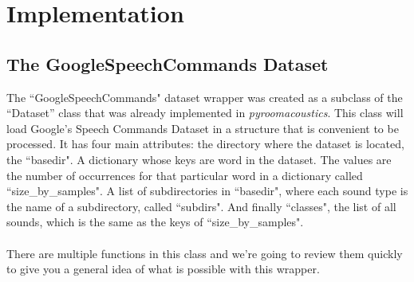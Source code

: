 \documentclass[11pt,a4paper,titlepage]{report}
\begin{document}
\chapter{Implementation}
\section{The GoogleSpeechCommands Dataset}
\hspace*{0.6cm}
The ``GoogleSpeechCommands" dataset wrapper was created as a subclass of the ``Dataset'' class that was already implemented in \textit{pyroomacoustics}. This class will load Google's Speech Commands Dataset in a structure that is convenient to be processed. It has four main attributes: the directory where the dataset is located, the ``basedir". A dictionary whose keys are word in the dataset. The values are the number of occurrences for that particular word in a dictionary called ``size\_by\_samples". A list of subdirectories in ``basedir", where each sound type is the name of a subdirectory, called ``subdirs". And finally ``classes", the list of all sounds, which is the same as the keys of ``size\_by\_samples".\\
\\
\hspace*{0.6cm}
There are multiple functions in this class and we're going to review them quickly to give you a general idea of what is possible with this wrapper.
\\
\end{document}
